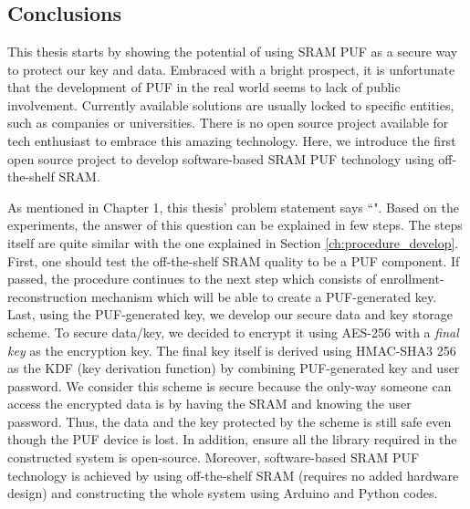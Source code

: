 \chapter{\chapterSix}
\label{chp:6}

\section{Conclusions}
This thesis starts by showing the potential of using SRAM PUF as a secure way to protect our key and data. Embraced with a bright prospect, it is unfortunate that the development of PUF in the real world seems to lack of public involvement. Currently available solutions are usually locked to specific entities, such as companies or universities. There is no open source project available for tech enthusiast to embrace this amazing technology. Here, we introduce the first open source project to develop software-based SRAM PUF technology using off-the-shelf SRAM.

As mentioned in Chapter 1, this thesis' problem statement says ``\problemStatement". Based on the experiments, the answer of this question can be explained in few steps.
The steps itself are quite similar with the one explained in Section \ref{ch:procedure_develop}.
First, one should test the off-the-shelf SRAM quality to be a PUF component. If passed, the procedure continues to the next step which consists of enrollment-reconstruction mechanism which will be able to create a PUF-generated key. Last, using the PUF-generated key, we develop our secure data and key storage scheme. To secure data/key, we decided to encrypt it using AES-256 with a \textit{final key} as the encryption key. The final key itself is derived using HMAC-SHA3 256 as the KDF (key derivation function) by combining PUF-generated key and user password. We consider this scheme is secure because the only-way someone can access the encrypted data is by having the SRAM and knowing the user password. Thus, the data and the key protected by the scheme is still safe even though the PUF device is lost.
In addition, ensure all the library required in the constructed system is open-source.
Moreover, software-based SRAM PUF technology is achieved by using off-the-shelf SRAM (requires no added hardware design) and constructing the whole system using Arduino and Python codes.

